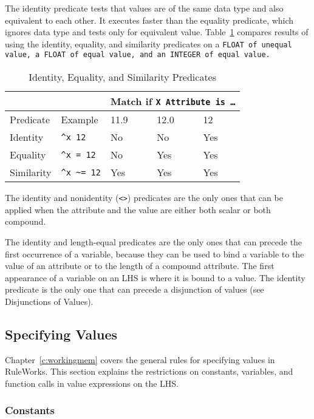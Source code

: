The identity predicate tests that values are of the same data type and
also equivalent to each other. It executes faster than the equality
predicate, which ignores data type and tests only for equivalent
value. Table~\ref{t:3-3} compares results of using the identity, equality, and
similarity predicates on a \tt{FLOAT} of unequal value, a \tt{FLOAT}
of equal value, and an \tt{INTEGER} of equal value.

\begin{table}[h]
  \centering
  \begin{tabular}{lllll}
    \toprule
    & & \multicolumn{3}{l}{Match if \ct\tt{X} Attribute is \ldots} \\
    \midrule
    Predicate & Example & 11.9 & 12.0 & 12 \\
    \midrule
    Identity & \verb|^x 12| & No & No & Yes \\
    Equality & \verb|^x = 12| & No & Yes & Yes \\
    Similarity & \verb|^x ~= 12| & Yes & Yes & Yes \\
    \bottomrule
  \end{tabular}
  \caption{Identity, Equality, and Similarity Predicates}
  \label{t:3-3}
\end{table}

The identity and nonidentity (\verb|<>|) predicates are the only ones
that can be applied when the attribute and the value are either both
scalar or both compound.

The identity and length-equal predicates are the only ones that can
precede the first occurrence of a variable, because they can be used
to bind a variable to the value of an attribute or to the length of a
compound attribute. The first appearance of a variable on an LHS is
where it is bound to a value. The identity predicate is the only one
that can precede a disjunction of values (see Disjunctions of Values).

\subsection{Specifying Values}

Chapter~\ref{c:workingmem} covers the general rules for specifying
values in RuleWorks. This section explains the restrictions on
constants, variables, and function calls in value expressions on the
LHS.

\subsubsection{Constants}

